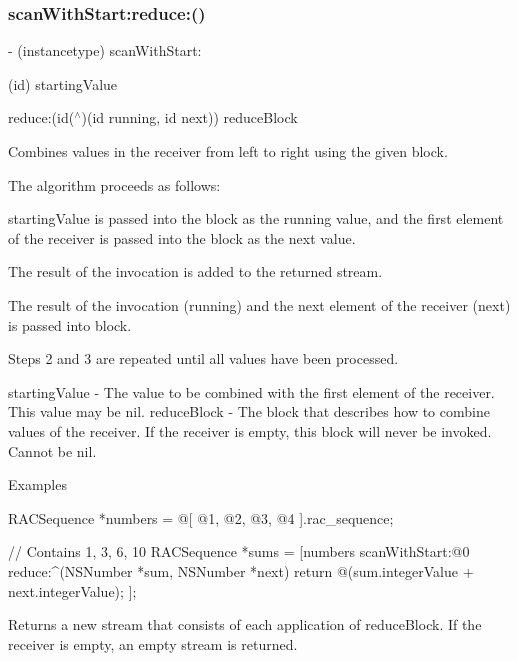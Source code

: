 \subsubsection{\texorpdfstring{scan\+With\+Start\+:reduce\+:()}{scanWithStart:reduce:()}\hspace{0.1cm}{\footnotesize\ttfamily [2/3]}}
{\footnotesize\ttfamily -\/ (instancetype) scan\+With\+Start\+: \begin{DoxyParamCaption}\item[{(id)}]{starting\+Value }\item[{reduce:(id($^\wedge$)(id running, id next))}]{reduce\+Block }\end{DoxyParamCaption}}

Combines values in the receiver from left to right using the given block.

The algorithm proceeds as follows\+:


\begin{DoxyEnumerate}
\item {\ttfamily starting\+Value} is passed into the block as the {\ttfamily running} value, and the first element of the receiver is passed into the block as the {\ttfamily next} value.
\item The result of the invocation is added to the returned stream.
\item The result of the invocation ({\ttfamily running}) and the next element of the receiver ({\ttfamily next}) is passed into {\ttfamily block}.
\item Steps 2 and 3 are repeated until all values have been processed.
\end{DoxyEnumerate}

starting\+Value -\/ The value to be combined with the first element of the receiver. This value may be {\ttfamily nil}. reduce\+Block -\/ The block that describes how to combine values of the receiver. If the receiver is empty, this block will never be invoked. Cannot be nil.

Examples \begin{DoxyVerb} RACSequence *numbers = @[ @1, @2, @3, @4 ].rac_sequence;

 // Contains 1, 3, 6, 10
 RACSequence *sums = [numbers scanWithStart:@0 reduce:^(NSNumber *sum, NSNumber *next) {
     return @(sum.integerValue + next.integerValue);
 }];
\end{DoxyVerb}


Returns a new stream that consists of each application of {\ttfamily reduce\+Block}. If the receiver is empty, an empty stream is returned. 

